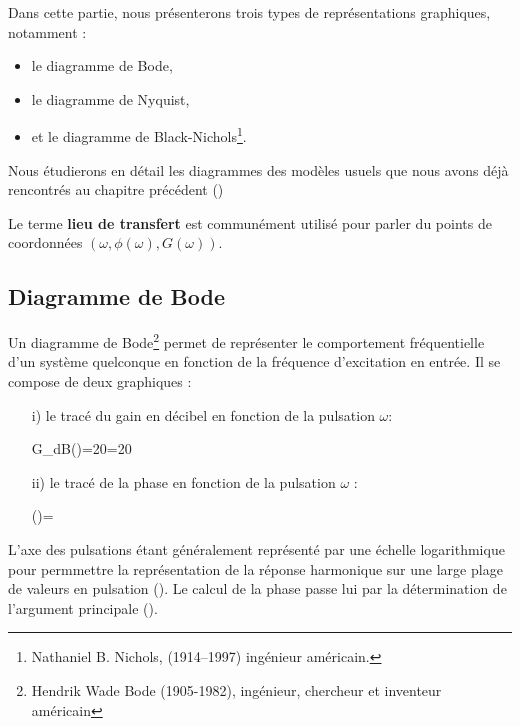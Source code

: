 Dans cette partie, nous présenterons trois types de représentations graphiques, 
notamment :
\begin{itemize}
    \item le diagramme de Bode,
    \item le diagramme de Nyquist,
    \item et le diagramme de Black-Nichols\footnote{
    Nathaniel B. Nichols, (1914–1997) 
           ingénieur américain.}. 
\end{itemize}
Nous étudierons en détail les diagrammes des modèles usuels que nous 
avons déjà rencontrés au chapitre précédent ()

Le terme \textbf{lieu de transfert} est communément utilisé pour parler du 
points de coordonnées $(\omega, \phi(\omega),G(\omega))$.


\subsection{Diagramme de Bode}

Un diagramme de Bode\footnote{Hendrik Wade Bode 
(1905-1982), ingénieur, chercheur et inventeur américain} permet de 
représenter le comportement fréquentielle d'un système quelconque en fonction 
de la fréquence  d'excitation en entrée. Il se compose de deux graphiques :
\begin{itemize}
    \item[i)] le tracé du gain en décibel en fonction de la pulsation $\omega$:
        \begin{bequation} 
        G_{dB}(\omega)=20=20 
        \end{bequation}
    \item[ii)] le tracé de la phase en fonction de la pulsation $\omega$ :
        \begin{bequation} 
        \phi(\omega)=
        \end{bequation}
\end{itemize}
L'axe des pulsations étant généralement représenté par une échelle 
logarithmique pour permmettre la représentation de la réponse harmonique sur 
une large plage de valeurs en pulsation (). Le calcul de la
phase passe lui par la détermination de l'argument principale 
().

